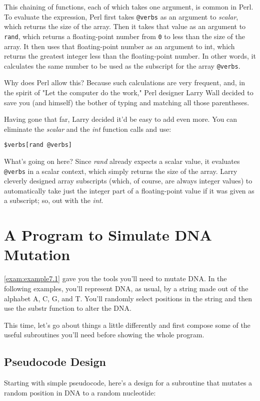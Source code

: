 This chaining of functions, each of which takes one argument, is common in Perl. To evaluate the expression, Perl first takes \verb|@verbs| as an argument to \textit{scalar}, which returns the size of the array. Then it takes that value as an argument to \verb|rand|, which returns a floating-point number from \verb|0| to less than the size of the array. It then uses that floating-point number as an argument to int, which returns the greatest integer less than the floating-point number. In other words, it calculates the same number to be used as the subscript for the array \verb|@verbs|.

Why does Perl allow this? Because such calculations are very frequent, and, in the spirit of "Let the computer do the work," Perl designer Larry Wall decided to save you (and himself) the bother of typing and matching all those parentheses.

Having gone that far, Larry decided it'd be easy to add even more. You can eliminate the \textit{scalar} and the \textit{int} function calls and use:

\begin{lstlisting}
$verbs[rand @verbs]
\end{lstlisting}

What's going on here? Since \textit{rand} already expects a scalar value, it evaluates \verb|@verbs| in a scalar context, which simply returns the size of the array. Larry cleverly designed array subscripts (which, of course, are always integer values) to automatically take just the integer part of a floating-point value if it was given as a subscript; so, out with the \textit{int}. 

\section{A Program to Simulate DNA Mutation}
  \autoref{exam:example7.1} gave you the tools you'll need to mutate DNA. In the following examples, you'll represent DNA, as usual, by a string made out of the alphabet A, C, G, and T. You'll randomly select positions in the string and then use the substr function to alter the DNA.

This time, let's go about things a little differently and first compose some of the useful subroutines you'll need before showing the whole program. 

\subsection{Pseudocode Design}
Starting with simple pseudocode, here's a design for a subroutine that mutates a random position in DNA to a random nucleotide:

